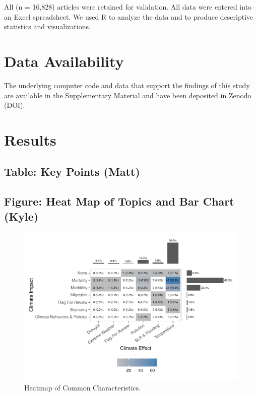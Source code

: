 \documentclass[12pt]{article}
\begin{document}
All (n = 16,828) articles were retained for validation. All data were
entered into an Excel spreadsheet. We used R to analyze the data and to
produce descriptive statistics and visualizations.

\hypertarget{data-availability}{%
\section{Data Availability}\label{data-availability}}

The underlying computer code and data that support the findings of this
study are available in the Supplementary Material and have been
deposited in Zenodo (DOI).

\hypertarget{results}{%
\section{Results}\label{results}}

\hypertarget{table-key-points-matt}{%
\subsection{Table: Key Points (Matt)}\label{table-key-points-matt}}

\hypertarget{figure-heat-map-of-topics-and-bar-chart-kyle}{%
\subsection{Figure: Heat Map of Topics and Bar Chart
(Kyle)}\label{figure-heat-map-of-topics-and-bar-chart-kyle}}

\begin{figure}
\centering
\includegraphics{MainDocument_files/figure-latex/heatmapcrosstab-1.pdf}
\caption{Heatmap of Common Characteristics. \label{fig-heatmap}}
\end{figure}
\end{document}
